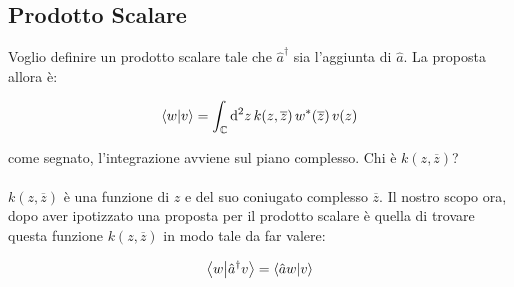 \vspace{1em}
\begin{minipage}{0.5\textwidth}
\end{minipage}
\hfill
\begin{minipage}{0.5\textwidth}
\end{minipage}
\vspace{1em}
	
\subsection{Prodotto Scalare}
	
	Voglio definire un prodotto scalare tale che $\hat{a}^{\dagger}$ sia l'aggiunta di $\hat{a}$. La proposta allora è:

\begin{nb}
\begin{align*}
	\braket{w}{v} = \int_{\mathbb{C}} \dd^2 z \, k(z, \overline{z}) \, w^*(\overline{z}) \, v(z) 
\end{align*}
\end{nb}
	
	come segnato, l'integrazione avviene sul piano complesso. Chi è $k(z, \overline{z})$?
	\\
	\\
	$k(z, \overline{z})$ è una funzione di $z$ e del suo coniugato complesso $\overline{z}$. Il nostro scopo ora, dopo aver ipotizzato una proposta per il prodotto scalare è quella di trovare questa funzione $k(z, \overline{z})$ in modo tale da far valere:
	
\begin{align*}
	\braket{w}{\hat{a}^{\dagger}v} = \braket{\hat{a}w}{v}
\end{align*}
	

